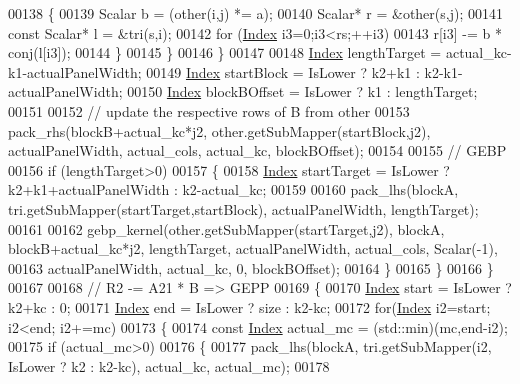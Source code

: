 \begin{DoxyCode}
00138               \{
00139                 Scalar b = (other(i,j) *= a);
00140                 Scalar* r = &other(s,j);
00141                 \textcolor{keyword}{const} Scalar* l = &tri(s,i);
00142                 \textcolor{keywordflow}{for} (\hyperlink{namespace_eigen_a62e77e0933482dafde8fe197d9a2cfde}{Index} i3=0;i3<rs;++i3)
00143                   r[i3] -= b * conj(l[i3]);
00144               \}
00145             \}
00146           \}
00147 
00148           \hyperlink{namespace_eigen_a62e77e0933482dafde8fe197d9a2cfde}{Index} lengthTarget = actual\_kc-k1-actualPanelWidth;
00149           \hyperlink{namespace_eigen_a62e77e0933482dafde8fe197d9a2cfde}{Index} startBlock   = IsLower ? k2+k1 : k2-k1-actualPanelWidth;
00150           \hyperlink{namespace_eigen_a62e77e0933482dafde8fe197d9a2cfde}{Index} blockBOffset = IsLower ? k1 : lengthTarget;
00151 
00152           \textcolor{comment}{// update the respective rows of B from other}
00153           pack\_rhs(blockB+actual\_kc*j2, other.getSubMapper(startBlock,j2), actualPanelWidth, actual\_cols, 
      actual\_kc, blockBOffset);
00154 
00155           \textcolor{comment}{// GEBP}
00156           \textcolor{keywordflow}{if} (lengthTarget>0)
00157           \{
00158             \hyperlink{namespace_eigen_a62e77e0933482dafde8fe197d9a2cfde}{Index} startTarget  = IsLower ? k2+k1+actualPanelWidth : k2-actual\_kc;
00159 
00160             pack\_lhs(blockA, tri.getSubMapper(startTarget,startBlock), actualPanelWidth, lengthTarget);
00161 
00162             gebp\_kernel(other.getSubMapper(startTarget,j2), blockA, blockB+actual\_kc*j2, lengthTarget, 
      actualPanelWidth, actual\_cols, Scalar(-1),
00163                         actualPanelWidth, actual\_kc, 0, blockBOffset);
00164           \}
00165         \}
00166       \}
00167       
00168       \textcolor{comment}{// R2 -= A21 * B => GEPP}
00169       \{
00170         \hyperlink{namespace_eigen_a62e77e0933482dafde8fe197d9a2cfde}{Index} start = IsLower ? k2+kc : 0;
00171         \hyperlink{namespace_eigen_a62e77e0933482dafde8fe197d9a2cfde}{Index} end   = IsLower ? size : k2-kc;
00172         \textcolor{keywordflow}{for}(\hyperlink{namespace_eigen_a62e77e0933482dafde8fe197d9a2cfde}{Index} i2=start; i2<end; i2+=mc)
00173         \{
00174           \textcolor{keyword}{const} \hyperlink{namespace_eigen_a62e77e0933482dafde8fe197d9a2cfde}{Index} actual\_mc = (std::min)(mc,end-i2);
00175           \textcolor{keywordflow}{if} (actual\_mc>0)
00176           \{
00177             pack\_lhs(blockA, tri.getSubMapper(i2, IsLower ? k2 : k2-kc), actual\_kc, actual\_mc);
00178 

\end{DoxyCode}
